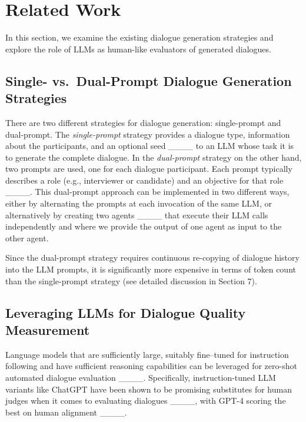 \section{Related Work}
In this section, we examine the existing dialogue generation strategies and explore the role of LLMs as human-like evaluators of generated dialogues.

\subsection{Single- vs.\ Dual-Prompt Dialogue Generation Strategies}
There are two different strategies for dialogue generation: single-prompt and dual-prompt. The \textit{single-prompt} strategy provides a dialogue type, information about the participants, and an optional seed ____ to an LLM whose task it is to generate the complete dialogue. In the \textit{dual-prompt} strategy on the other hand, two prompts are used, one for each dialogue participant. Each prompt typically describes a role (e.g., interviewer or candidate) and an objective for that role ____. This dual-prompt approach can be implemented in two different ways, either by alternating the prompts at each invocation of the same LLM, or alternatively by creating two agents ____ that execute their LLM calls independently and where we provide the output of one agent as input to the other agent.

Since the dual-prompt strategy requires continuous re-copying of dialogue history into the LLM prompts, it is significantly more expensive in terms of token count than the single-prompt strategy (see detailed discussion in Section 7). 

\subsection{Leveraging LLMs for Dialogue Quality Measurement}
Language models that are sufficiently large, suitably fine–tuned for instruction following and have sufficient reasoning capabilities can be leveraged for zero-shot automated dialogue evaluation ____. Specifically, instruction-tuned LLM variants like ChatGPT have been shown to be promising substitutes for human judges when it comes to evaluating dialogues ____, with GPT-4 scoring the best on human alignment ____.